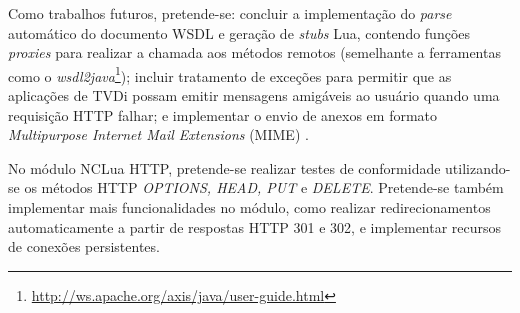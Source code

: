 Como trabalhos futuros, pretende-se: concluir a implementação do \textit{parse} automático do 
documento WSDL e geração de \textit{stubs} Lua, contendo funções \textit{proxies} para realizar a chamada aos métodos remotos
(semelhante a ferramentas como o \textit{wsdl2java}\footnote{\url{http://ws.apache.org/axis/java/user-guide.html}});
incluir tratamento de exceções para permitir que as aplicações
de TVDi possam emitir mensagens amigáveis ao usuário quando uma requisição HTTP falhar;
e implementar o envio de anexos em formato \textit{Multipurpose Internet Mail Extensions} (MIME)
\cite{rfc2045}.

No módulo NCLua HTTP, pretende-se realizar testes
de conformidade utilizando-se os métodos HTTP \textit{OPTIONS, HEAD, PUT} e \textit{DELETE}. Pretende-se também
implementar mais funcionalidades no módulo, como realizar redirecionamentos automaticamente
a partir de respostas HTTP 301 e 302, e implementar recursos de conexões persistentes.


